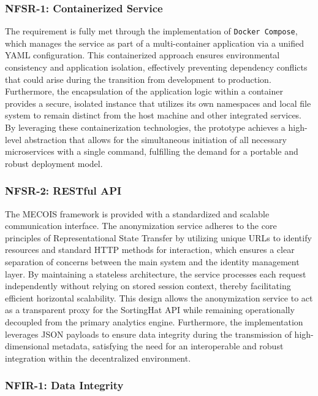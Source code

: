 \subsubsection{NFSR-1: Containerized Service}

The requirement is fully met through the implementation of \texttt{Docker Compose}, which manages the service as part of a multi-container application via a unified YAML configuration. This containerized approach ensures environmental consistency and application isolation, effectively preventing dependency conflicts that could arise during the transition from development to production. Furthermore, the encapsulation of the application logic within a container provides a secure, isolated instance that utilizes its own namespaces and local file system to remain distinct from the host machine and other integrated services. By leveraging these containerization technologies, the prototype achieves a high-level abstraction that allows for the simultaneous initiation of all necessary microservices with a single command, fulfilling the demand for a portable and robust deployment model.

\subsubsection{NFSR-2: RESTful API}

The MECOIS framework is provided with a standardized and scalable communication interface. The anonymization service adheres to the core principles of Representational State Transfer by utilizing unique \acp{URL} to identify resources and standard \ac{HTTP} methods for interaction, which ensures a clear separation of concerns between the main system and the identity management layer. By maintaining a stateless architecture, the service processes each request independently without relying on stored session context, thereby facilitating efficient horizontal scalability. This design allows the anonymization service to act as a transparent proxy for the SortingHat \ac{API} while remaining operationally decoupled from the primary analytics engine. Furthermore, the implementation leverages \ac{JSON} payloads to ensure data integrity during the transmission of high-dimensional metadata, satisfying the need for an interoperable and robust integration within the decentralized environment.

\subsubsection{NFIR-1: Data Integrity}

